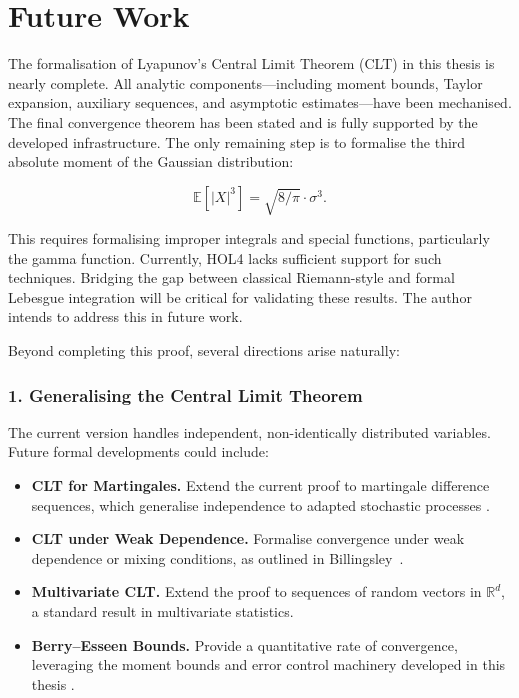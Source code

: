 \chapter{Future Work}
\label{future}

The formalisation of Lyapunov’s Central Limit Theorem (CLT) in this thesis is nearly complete. All analytic components—including moment bounds, Taylor expansion, auxiliary sequences, and asymptotic estimates—have been mechanised. The final convergence theorem has been stated and is fully supported by the developed infrastructure. The only remaining step is to formalise the third absolute moment of the Gaussian distribution:

\[
\mathbb{E}[|X|^3] = \sqrt{8/\pi} \cdot \sigma^3.
\]

This requires formalising improper integrals and special functions, particularly the gamma function. Currently, HOL4 lacks sufficient support for such techniques. Bridging the gap between classical Riemann-style and formal Lebesgue integration will be critical for validating these results. The author intends to address this in future work.

Beyond completing this proof, several directions arise naturally:

\subsection*{1. Generalising the Central Limit Theorem}

The current version handles independent, non-identically distributed variables. Future formal developments could include:

\begin{itemize}
\item \textbf{CLT for Martingales.} Extend the current proof to martingale difference sequences, which generalise independence to adapted stochastic processes \cite{hall2014martingale}.
\item \textbf{CLT under Weak Dependence.} Formalise convergence under weak dependence or mixing conditions, as outlined in Billingsley~\cite{billingsley2017probability}.
\item \textbf{Multivariate CLT.} Extend the proof to sequences of random vectors in \( \mathbb{R}^d \), a standard result in multivariate statistics.
\item \textbf{Berry–Esseen Bounds.} Provide a quantitative rate of convergence, leveraging the moment bounds and error control machinery developed in this thesis \cite{berry1941accuracy}.
\end{itemize}


